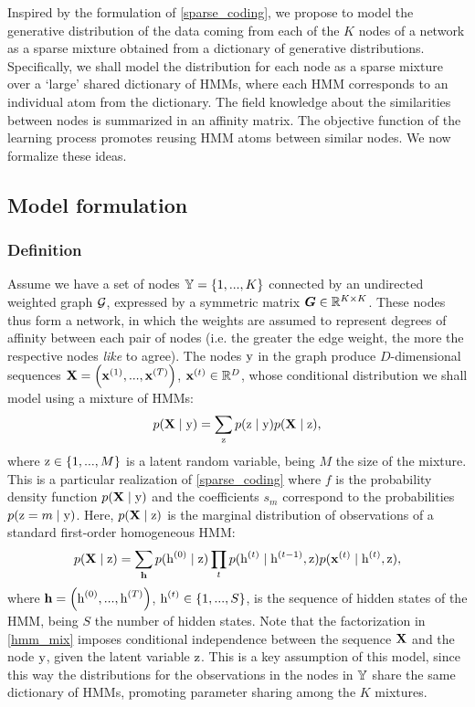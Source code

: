 Inspired by the formulation of \eqref{sparse_coding}, we propose to model the generative distribution of the data coming from each of the $K$ nodes of a network as a sparse mixture obtained from a dictionary of generative distributions. Specifically, we shall model the distribution for each node as a sparse mixture over a `large' shared dictionary of HMMs, where each HMM corresponds to an individual atom from the dictionary.
The field knowledge about the similarities between nodes is summarized in an affinity matrix. The objective function of the learning process promotes reusing HMM atoms between similar nodes.
We now formalize these ideas.

\subsection{Model formulation}
\subsubsection{Definition}
\label{sec:definition}
Assume we have a set of nodes ${\mathbb{Y}}=\{1, ..., K\}$ connected by an undirected weighted graph ${\mathcal{G}}$, expressed by a symmetric matrix ${\bm{G}} \in \mathbb{R}^{K \times K}$. These nodes thus form a network, in which the weights are assumed to represent degrees of affinity between each pair of nodes (i.e. the greater the edge weight, the more the respective nodes \textit{like} to agree). The nodes ${\textnormal{y}}$ in the graph produce $D$-dimensional sequences ${\mathbf{X}} = \left({\mathbf{x}}^{(1)}, ...,{\mathbf{x}}^{(T)} \right)$, ${\mathbf{x}}^{(t)} \in \mathbb{R}^D$, whose conditional distribution we shall model using a mixture of HMMs:
\begin{equation}
\label{hmm_mix}
p({\mathbf{X}} \mid {\textnormal{y}}) = \sum_{{\textnormal{z}}} p({\textnormal{z}}\mid{\textnormal{y}}) p({\mathbf{X}} \mid {\textnormal{z}}),
\end{equation}
where ${\textnormal{z}} \in \{1, ..., M\}$ is a latent random variable, being $M$ the size of the mixture. This is a particular realization of \eqref{sparse_coding} where $f$ is the probability density function $p({\mathbf{X}} \mid {\textnormal{y}})$ and the coefficients $s_m$ correspond to the probabilities $p({\textnormal{z}} = m \mid {\textnormal{y}})$. Here, $p({\mathbf{X}} \mid {\textnormal{z}})$ is the marginal distribution of observations of a standard first-order homogeneous HMM:
\begin{equation}
\label{hmm}
p({\mathbf{X}} \mid {\textnormal{z}}) = \sum_{{\mathbf{h}}} p({\textnormal{h}}^{(0)}\mid{\textnormal{z}}) \prod_t p({\textnormal{h}}^{(t)}\mid{\textnormal{h}}^{(t-1)},{\textnormal{z}}) p({\mathbf{x}}^{(t)}\mid{\textnormal{h}}^{(t)},{\textnormal{z}}),
\end{equation}
where ${\mathbf{h}} = \left({\textnormal{h}}^{(0)}, ...,{\textnormal{h}}^{(T)} \right)$, ${\textnormal{h}}^{(t)} \in \{1, ..., S\}$, is the sequence of hidden states of the HMM, being $S$ the number of hidden states. Note that the factorization in \eqref{hmm_mix} imposes conditional independence between the sequence ${\mathbf{X}}$ and the node ${\textnormal{y}}$, given the latent variable ${\textnormal{z}}$. This is a key assumption of this model, since this way the distributions for the observations in the nodes in ${\mathbb{Y}}$ share the same dictionary of HMMs, promoting parameter sharing among the $K$ mixtures.

